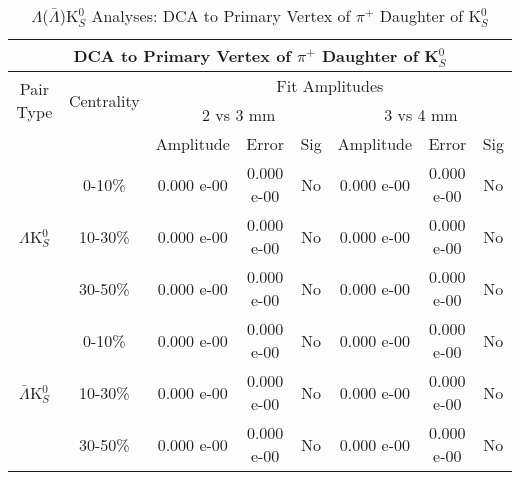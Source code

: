 \documentclass[../AnalysisNoteJBuxton.tex]{subfiles}
\begin{document}
\begin{table}
 \centering
 \begin{tabular}{|c|c|c|c|c||c|c|c|}
  \multicolumn{8}{c}{DCA to Primary Vertex of $\pi^{+}$ Daughter of K$^{0}_{S}$} \\
  \hline
  \multirow{2}{*}{Pair Type} & \multirow{2}{*}{Centrality} & \multicolumn{6}{c|}{Fit Amplitudes} \\
  \cline{3-8}
   & & \multicolumn{3}{c||}{2 vs 3 mm} & \multicolumn{3}{c|}{3 vs 4 mm} \\
  \hline
   & & Amplitude & Error & Sig & Amplitude & Error & Sig \\
  \hline  
  \multirow{3}{*}{$\Lambda$K$^{0}_{S}$}  
   &  0-10\% & 0.000 e-00 & 0.000 e-00 & No & 0.000 e-00 & 0.000 e-00 & No \\
   & 10-30\% & 0.000 e-00 & 0.000 e-00 & No & 0.000 e-00 & 0.000 e-00 & No \\
   & 30-50\% & 0.000 e-00 & 0.000 e-00 & No & 0.000 e-00 & 0.000 e-00 & No \\
  \hline  
  \multirow{3}{*}{$\bar{\Lambda}$K$^{0}_{S}$}  
   &  0-10\% & 0.000 e-00 & 0.000 e-00 & No & 0.000 e-00 & 0.000 e-00 & No \\
   & 10-30\% & 0.000 e-00 & 0.000 e-00 & No & 0.000 e-00 & 0.000 e-00 & No \\
   & 30-50\% & 0.000 e-00 & 0.000 e-00 & No & 0.000 e-00 & 0.000 e-00 & No \\
  \hline
 \end{tabular}
 \caption{$\Lambda$($\bar{\Lambda}$)K$^{0}_{S}$ Analyses: DCA to Primary Vertex of $\pi^{+}$ Daughter of K$^{0}_{S}$}
 \label{tab:DcaToPrimVertexPosPionDaughtOfK0LamK0}
\end{table}
\end{document}
